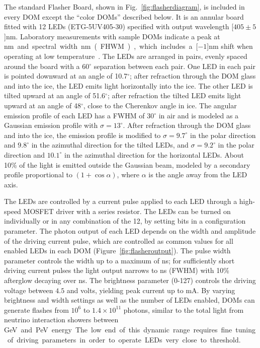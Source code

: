 The standard Flasher Board, shown in Fig.~\ref{fig:flasherdiagram}, is
included in every DOM except the ``color DOMs''
described below. It is an annular board fitted with 12 LEDs (ETG-5UV405-30)
specified with output wavelength \unit[$405\pm5$]nm.  Laboratory
measurements with sample DOMs indicate a peak at
\unit[399]nm and spectral width \unit[14]nm (FHWM), which includes a
\unit[$-1$]nm shift when operating at low temperature~\cite{Aartsen:2013rt}.
The LEDs are arranged in pairs, evenly spaced around the board
with a 60$^{\circ}$ separation between each pair. One LED in each pair
is pointed downward at an angle of 10.7$^{\circ}$; after refraction through the DOM glass and into
the ice, the LED
emits light horizontally into the ice. The other LED is tilted upward
at an angle of 51.6$^{\circ}$; after refraction the tilted LED
emits light upward at an angle 
of 48$^{\circ}$, close to the Cherenkov angle in ice.
The angular emission profile of each LED has a FWHM of
30$^{\circ}$ in air and is modeled as a Gaussian emission profile
with $\sigma = 13^{\circ}$. After refraction through the DOM glass and into
the ice, the emission profile is modified to $\sigma = 9.7^{\circ}$ in the polar direction
and $9.8^{\circ}$ in the azimuthal direction for the tilted LEDs, and $\sigma=9.2^{\circ}$ in the polar direction
and $10.1^{\circ}$ in the azimuthal direction for the horizontal LEDs.
About 10\% of the light is emitted outside the Gaussian beam, modeled by
a secondary profile proportional to $(1+\cos{\alpha})$, where $\alpha$ is the angle
away from the LED axis.

The LEDs are controlled by a current pulse applied to each LED through
a high-speed MOSFET driver with a series resistor. The LEDs can be turned on individually or in any
combination of the 12, by setting bits in a configuration parameter.
The photon output of each LED depends on the width and
amplitude of the driving current pulse, which are controlled as common
values for all enabled LEDs in each DOM (Figure~\ref{fig:flasheroutput}).  
The pulse width parameter controls the width up to a maximum of \unit[70]{ns}; 
for sufficiently short driving current pulses the light output narrows to \unit[6]{ns} (FWHM) with
10\% afterglow decaying over \unit[15--20]{ns}.
The brightness parameter (0-127) controls the driving voltage between $4.5$ and \unit[15]{volts}, yielding
peak current up to \unit[300]{mA}.
By varying brightness and width settings as well as the number of LEDs enabled, DOMs can generate flashes
from $10^6$ to $1.4\times10^{11}$ photons, similar to the total light from
neutrino interaction showers between \unit[7]GeV and \unit[1]PeV energy.
The low end of this dynamic range requires fine tuning of driving
parameters in order to operate LEDs very close to threshold.

